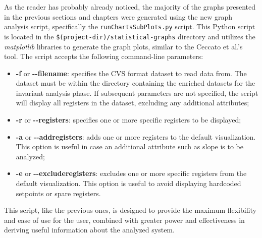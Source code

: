 
\bigskip
As the reader has probably already noticed, the majority of the graphs presented in the previous sections and chapters were generated using the new graph analysis script, specifically the \texttt{runChartsSubPlots.py} script. This Python script is located in the \texttt{\$(project-dir)/statistical-graphs} directory and utilizes the \textit{matplotlib} libraries to generate the graph plots, similar to the Ceccato et al.'s tool.\newline 
The script accepts the following command-line parameters:

\begin{itemize}
	\item \textbf{-f} or \textbf{{-}{-}filename}: specifies the CVS format dataset to read data from. The dataset must be within the directory containing the enriched datasets for the invariant analysis phase. If subsequent parameters are not specified, the script will display all registers in the dataset, excluding any additional attributes;
	
	\item \textbf{-r} or \textbf{{-}{-}registers}: specifies one or more specific registers to be displayed;
	
	\item \textbf{-a} or \textbf{{-}{-}addregisters}: adds one or more registers to the default visualization. This option is useful in case an additional attribute such as slope is to be analyzed;
	
	\item \textbf{-e} or \textbf{{-}{-}excluderegisters}: excludes one or more specific registers from the default visualization. This option is useful to avoid displaying hardcoded setpoints or spare registers.
\end{itemize}
This script, like the previous ones, is designed to provide the maximum flexibility and ease of use for the user, combined with greater power and effectiveness in deriving useful information about the analyzed system.


